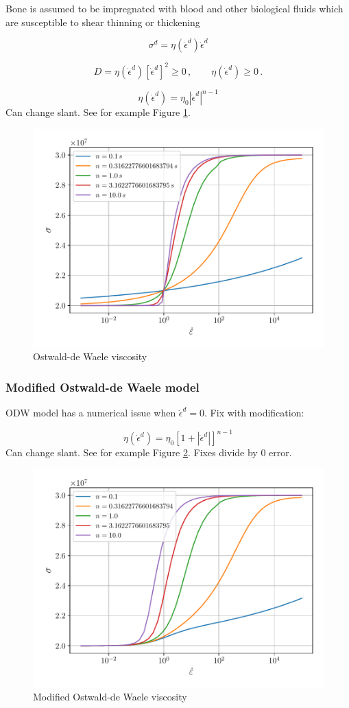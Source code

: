 \documentclass[12pt]{article}
\begin{document}
Bone is assumed to be impregnated with blood and other biological fluids which are susceptible to shear thinning or thickening

\begin{equation}
\sigma^{d} = \eta(\dot{\epsilon}^{d})\dot{\epsilon}^{d}
\end{equation}

\begin{equation}
D = \eta(\dot{\epsilon}^{d})\left[\dot{\epsilon}^{d}\right]^{2} \geq 0 \,, \qquad \eta(\dot{\epsilon}^{d})\geq 0\,.
\end{equation}

\begin{equation}
\eta(\dot{\epsilon}^{d}) = \eta_{0} |\dot{\epsilon}^{d}|^{n-1}
\end{equation}
Can change slant. See for example Figure \ref{fig:odw}.
\begin{figure}[!htb]
	\centering
	\includegraphics[width=0.65\linewidth]{odw}
	\caption{Ostwald-de Waele viscosity}
	\label{fig:odw}	
\end{figure}

\subsubsection{Modified Ostwald-de Waele model}

ODW model has a numerical issue when $\dot{\epsilon}^{d}=0$. Fix with modification:

\begin{equation}
\eta(\dot{\epsilon}^{d}) = \eta_{0}\left[1+|\dot{\epsilon}^{d}|\right]^{n-1}
\end{equation}
Can change slant. See for example Figure \ref{fig:modw}. Fixes divide by 0 error.
\begin{figure}[!htb]
	\centering
	\includegraphics[width=0.65\linewidth]{modw}
	\caption{Modified Ostwald-de Waele viscosity}
	\label{fig:modw}	
\end{figure}
\end{document}
